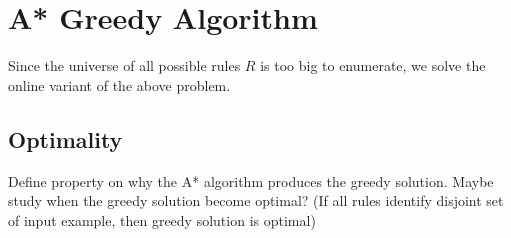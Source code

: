 \section{A* Greedy Algorithm} \label{sec:greedy_alg}
Since the universe of all possible rules $R$ is too big to enumerate, we solve the online variant of the above problem.  

\subsection{Optimality}
Define property on why the A* algorithm produces the greedy solution.
Maybe study when the greedy solution become optimal? (If all rules identify disjoint set of input example, then greedy solution is optimal)
